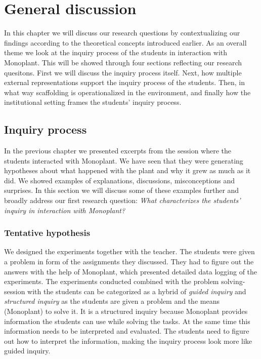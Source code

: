 \chapter{General discussion}
In this chapter we will discuss our research questions by contextualizing our findings according to the theoretical concepts introduced earlier. As an overall theme we look at the inquiry process of the students in interaction with Monoplant. This will be showed through four sections reflecting our research quesitons.  First we will discuss the inquiry process itself. Next, how multiple external representations support the inquiry process of the students. Then, in what way scaffolding is operationalized in the environment, and finally how the institutional setting frames the students' inquiry process.


\section{Inquiry process}
In the previous chapter we presented excerpts from the session where the students interacted with Monoplant. We have seen that they were generating hypotheses about what happened with the plant and why it grew as much as it did. We showed examples of explanations, discussions, misconceptions and surprises. In this section we will discuss some of these examples further and broadly address our first research question: \emph{What characterizes the students' inquiry in interaction with Monoplant?}

\subsection{Tentative hypothesis}
We designed the experiments together with the teacher. The students were given a problem in form of the assignments they discussed. They had to figure out the answers with the help of Monoplant, which presented detailed data logging of the experiments. The experiments conducted combined with the problem solving-session with the students can be categorized as a hybrid of \emph{guided inquiry} and \emph{structured inquiry} \citetext{\citealp{staver1987analysis}, referenced in \citealp{prince2006inductive}} as the students are given a problem and the means (Monoplant) to solve it. It is a structured inquiry because Monoplant provides information the students can use while solving the tasks. At the same time this information needs to be interpreted and evaluated. The students need to figure out how to interpret the information, making the inquiry process look more like guided inquiry.

